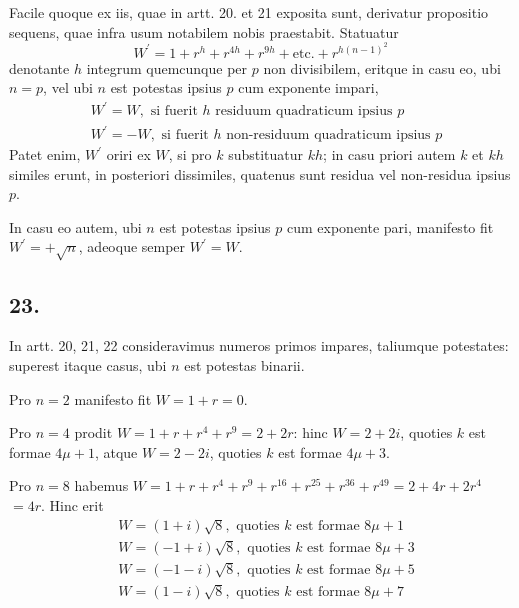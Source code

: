 \documentclass[twoside,12pt]{memoir}
\begin{document}
Facile quoque ex iis, quae in artt. 20. et 21 exposita sunt, derivatur propositio sequens, quae infra usum notabilem nobis praestabit. Statuatur
\[W^{\prime}=1+r^{h}+r^{4 h}+r^{9 h}+\text{etc.}+r^{h(n-1)^{2}}\]\pagebreak%
denotante \(h\) integrum quemcunque per \(p\) non divisibilem, eritque in casu eo, ubi \(n=p\), vel ubi \(n\) est potestas ipsius \(p\) cum exponente impari,
\[\begin{aligned}
& W^{\prime}=W, \text{ si fuerit } h \text{ residuum quadraticum ipsius } p \\
& W^{\prime}=-W, \text{ si fuerit } h \text{ non-residuum quadraticum ipsius } p
\end{aligned}\]
Patet enim, \(W^{\prime}\) oriri ex \(W\), si pro \(k\) substituatur \(k h\); in casu priori autem \(k\) et \(k h\) similes erunt, in posteriori dissimiles, quatenus sunt residua vel non-residua ipsius \(p\).
 
In casu eo autem, ubi \(n\) est potestas ipsius \(p\) cum exponente pari, manifesto fit \(W^{\prime}=+\surd n\), adeoque semper \(W^{\prime}=W\).

\subsection*{23.}
 
In artt. 20, 21, 22 consideravimus numeros primos impares, taliumque potestates: superest itaque casus, ubi \(n\) est potestas binarii.
 
Pro \(n=2\) manifesto fit \(W=1+r=0\).
 
Pro \(n=4\) prodit \(W=1+r+r^{4}+r^{9}=2+2 r\): hinc \(W=2+2 i\), quoties \(k\) est formae \(4 \mu+1\), atque \(W=2-2 i\), quoties \(k\) est formae \(4 \mu+3\).
 
Pro \(n=8\) habemus \(W=1+r+r^{4}+r^{9}+r^{16}+r^{25}+r^{36}+r^{49}=2+4 r+2 r^{4}\) \(=4 r\). Hinc erit
\[\begin{aligned}
& W=(1+i) \surd 8, \text{ quoties } k \text{ est formae } 8 \mu+1 \\
& W=(-1+i) \surd 8, \text{ quoties } k \text{ est formae } 8 \mu+3 \\
& W=(-1-i) \surd 8, \text{ quoties } k \text{ est formae } 8 \mu+5 \\
& W=(1-i) \surd 8, \text{ quoties } k \text{ est formae } 8 \mu+7
\end{aligned}\]
\end{document}

